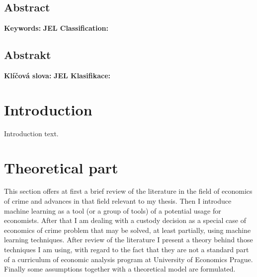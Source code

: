 \documentclass[12pt, twoside]{book} %
\renewcommand{\baselinestretch}{1.5}
\begin{document}
\section*{Abstract}   %
\textbf{Keywords:} \newline
\textbf{JEL Classification:}


\section*{Abstrakt}
\textbf{Klíčová slova:} \newline
\textbf{JEL Klasifikace:}

\tableofcontents    %
\renewcommand{\thepage}{\arabic{page}}
\renewcommand{\baselinestretch}{1.5}


\chapter*{Introduction}     %
\pagestyle{plain}
Introduction text.


\chapter{Theoretical part}    %
This section offers at first a brief review of the literature in the field of economics of crime and advances in that field relevant to my thesis. Then I introduce machine learning as a tool (or a group of tools) of a potential usage for economists. After that I am dealing with a custody decision as a special case of economics of crime problem that may be solved, at least partially, using machine learning techniques.\newline
After review of the literature I present a theory behind those techniques I am using, with regard to the fact that they are not a standard part of a curriculum of economic analysis program at University of Economics Prague. Finally some assumptions together with a theoretical model are formulated. 
\end{document}
